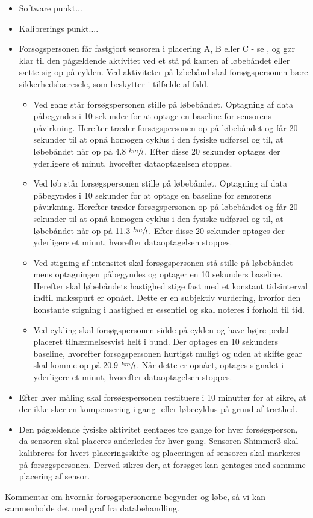 \begin{itemize}
	\item Software punkt...
	\item Kalibrerings punkt....
	\item Forsøgspersonen får fastgjort sensoren i placering A, B eller C - se , og gør klar til den pågældende aktivitet ved et stå på kanten af løbebåndet eller sætte sig op på cyklen. Ved aktiviteter på løbebånd skal forsøgspersonen bære sikkerhedsbæresele, som beskytter i tilfælde af fald.
	\begin{itemize}
		\item Ved gang står forsøgspersonen stille på løbebåndet. Optagning af data påbegyndes i 10 sekunder for at optage en baseline for sensorens påvirkning. Herefter træder forsøgspersonen op på løbebåndet og får 20 sekunder til at opnå homogen cyklus i den fysiske udførsel og til, at løbebåndet når op på 4.8 $\sfrac{km}{t}$. Efter disse 20 sekunder optages der yderligere et minut, hvorefter dataoptagelsen stoppes.
		\item Ved løb står forsøgspersonen stille på løbebåndet. Optagning af data påbegyndes i 10 sekunder for at optage en baseline for sensorens påvirkning. Herefter træder forsøgspersonen op på løbebåndet og får 20 sekunder til at opnå homogen cyklus i den fysiske udførsel og til, at løbebåndet når op på 11.3 $\sfrac{km}{t}$. Efter disse 20 sekunder optages der yderligere et minut, hvorefter dataoptagelsen stoppes.
		\item Ved stigning af intensitet skal forsøgspersonen stå stille på løbebåndet mens optagningen påbegyndes og optager en 10 sekunders baseline. Herefter skal løbebåndets hastighed stige fast med et konstant tidsinterval indtil maksspurt er opnået. Dette er en subjektiv vurdering, hvorfor den konstante stigning i hastighed er essentiel og skal noteres i forhold til tid.
		\item Ved cykling skal forsøgspersonen sidde på cyklen og have højre pedal placeret tilnærmelsesvist helt i bund. Der optages en 10 sekunders baseline, hvorefter forsøgspersonen hurtigst muligt og uden at skifte gear skal komme op på 20.9 $\sfrac{km}{t}$. Når dette er opnået, optages signalet i yderligere et minut, hvorefter dataoptagelsen stoppes.
	\end{itemize}
	\item Efter hver måling skal forsøgspersonen restituere i 10 minutter for at sikre, at der ikke sker en kompensering i gang- eller løbecyklus på grund af træthed. %
	\item Den pågældende fysiske aktivitet gentages tre gange for hver forsøgsperson, da sensoren skal placeres anderledes for hver gang. Sensoren Shimmer3 skal kalibreres for hvert placeringsskifte og placeringen af sensoren skal markeres på forsøgspersonen. Derved sikres der, at forsøget kan gentages med sammme placering af sensor.
\end{itemize}




Kommentar om hvornår forsøgspersonerne begynder og løbe, så vi kan sammenholde det med graf fra databehandling.